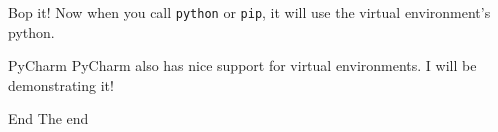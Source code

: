\begin{frame}[containsverbatim]{Bop it!}
  Now when you call \verb|python| or \verb|pip|, it will use the virtual environment's python.
\end{frame}

\begin{frame}[containsverbatim]{PyCharm}
  PyCharm also has nice support for virtual environments. I will be demonstrating it!
\end{frame}


\begin{frame}[standout]{End}
  The end
\end{frame}


